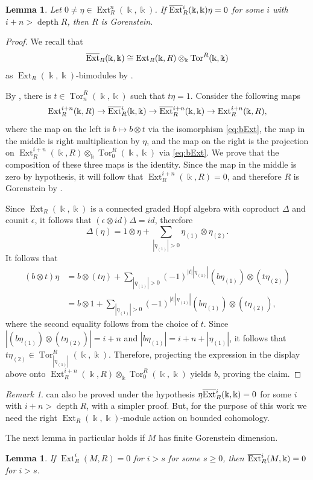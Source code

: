 \documentclass{amsart}
\newtheorem{lemma}[theorem]{Lemma}
\theoremstyle{definition}
\theoremstyle{definition}
\theoremstyle{remark}
\newtheorem{remark}[theorem]{Remark}
\numberwithin{equation}{section}
\newcommand{\kk}{\Bbbk}
\newcommand{\Ext}{\operatorname{Ext}}
\newcommand{\bExt}{\overline{\operatorname{Ext}}{\vphantom E}}
\newcommand{\Tor}{\operatorname{Tor}}
\newcommand{\depth}{\operatorname{depth}}
\begin{document}
\begin{lemma}\label{lem:Gor}
Let $0\neq\eta\in\Ext_R^n(\kk,\kk)$. If $\bExt_R^i(\kk,\kk)\eta=0$ for some $i$ with $i+n>\depth R$, then $R$ is Gorenstein.
\end{lemma}
\begin{proof}
We recall that
\begin{equation}\label{eq:bExt}
\bExt_R(\kk,\kk)\cong\Ext_R(\kk,R)\otimes_\kk\Tor^R(\kk,\kk)
\end{equation}
as $\Ext_R(\kk,\kk)$-bimodules by \cite[Corollary 3.5]{bimodule}.

By , there is $t\in\Tor_n^R(\kk,\kk)$ such that $t\eta=1$. Consider the following maps
\[
\Ext_R^{i+n}(\kk,R)\rightarrow\bExt_R^{i}(\kk,\kk)\rightarrow\bExt_R^{i+n}(\kk,\kk)\rightarrow\Ext_R^{i+n}(\kk,R),
\]
where the map on the left is $b\mapsto b\otimes t$ via the isomorphism \eqref{eq:bExt}, the map in the middle is right multiplication by $\eta$, and the map on the right is the projection on $\Ext_R^{i+n}(\kk,R)\otimes_\kk\Tor^R_0(\kk,\kk)$ via \eqref{eq:bExt}. We prove that the composition of these three maps is the identity. Since the map in the middle is zero by hypothesis, it will follow that $\Ext_R^{i+n}(\kk,R)=0$, and therefore $R$ is Gorenstein by \cite[Proposition 2.3]{foxbyMu}.

Since $\Ext_R(\kk,\kk)$ is a connected graded Hopf algebra with coproduct $\Delta$ and counit $\epsilon$, it follows that $(\epsilon\otimes id)\Delta=id$, therefore
\[
\Delta(\eta)=1\otimes\eta+\sum_{|\eta_{(1)}|>0}\eta_{(1)}\otimes\eta_{(2)}.
\]
It follows that
\begin{align*}
(b\otimes t)\eta&=b\otimes(t\eta)+\sum_{|\eta_{(1)}|>0}(-1)^{|t||\eta_{(1)}|}(b\eta_{(1)})\otimes(t\eta_{(2)})\\
&=b\otimes1+\sum_{|\eta_{(1)}|>0}(-1)^{|t||\eta_{(1)}|}(b\eta_{(1)})\otimes(t\eta_{(2)}),
\end{align*}
where the second equality follows from the choice of $t$. Since $|(b\eta_{(1)})\otimes(t\eta_{(2)})|=i+n$ and $|b\eta_{(1)}|=i+n+|\eta_{(1)}|$, it follows that $t\eta_{(2)}\in\Tor^R_{|\eta_{(1)}|}(\kk,\kk)$. Therefore, projecting the expression in the display above onto $\Ext_R^{i+n}(\kk,R)\otimes_\kk\Tor^R_0(\kk,\kk)$ yields $b$, proving the claim.
\end{proof}
\begin{remark}
 can also be proved under the hypothesis $\eta\bExt_R^i(\kk,\kk)=0$ for some $i$ with $i+n>\depth R$, with a simpler proof. But, for the purpose of this work we need the right $\Ext_R(\kk,\kk)$-module action on bounded cohomology.
\end{remark}
The next lemma in particular holds if $M$ has finite Gorenstein dimension.
\begin{lemma}\label{lem:vanishing}
If $\Ext_R^i(M,R)=0$ for $i>s$ for some $s\geq0$, then $\bExt_R^i(M,\kk)=0$ for $i>s$.
\end{lemma}
\end{document}
